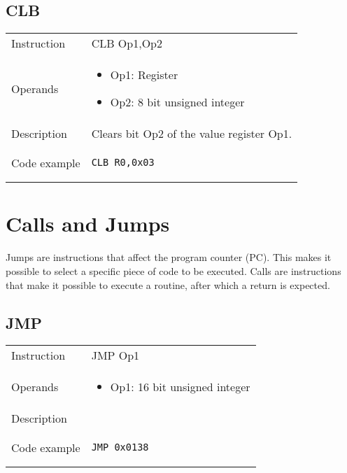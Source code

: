 \subsection{CLB}
\renewcommand*{\arraystretch}{2.0}
\begin{longtable}{P{3cm}P{9cm}}
\midrule
\noindent Instruction & CLB Op1,Op2 \\
\noindent Operands &
\begin{itemize}[label={},noitemsep,leftmargin=*,topsep=0pt,partopsep=0pt, itemsep=1em]
\item Op1: Register

\item Op2: 8 bit unsigned integer
\end{itemize}\\
\noindent Description & Clears bit Op2 of the value register Op1. \\
\noindent Code example & 
\begin{lstlisting}
CLB R0,0x03
\end{lstlisting} \\
\end{longtable}


\newpage

\section{Calls and Jumps}
Jumps are instructions that affect the program counter (PC). This makes it possible to select a specific piece of code to be executed.
Calls are instructions that make it possible to execute a routine, after which a return is expected.

\subsection{JMP}
\renewcommand*{\arraystretch}{2.0}
\begin{longtable}{P{3cm}P{9cm}}
\midrule
\noindent Instruction & JMP Op1 \\
\noindent Operands &
\begin{itemize}[label={},noitemsep,leftmargin=*,topsep=0pt,partopsep=0pt, itemsep=1em]
\item Op1: 16 bit unsigned integer
\end{itemize}\\
\noindent Description &  \\
\noindent Code example & 
\begin{lstlisting}
JMP 0x0138
\end{lstlisting} \\
\end{longtable}


